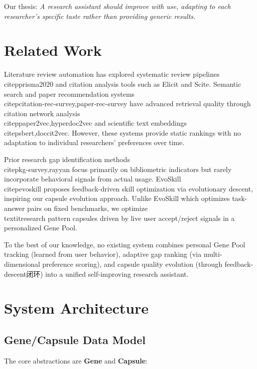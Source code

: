 \documentclass[anon,9pt]{article}
\begin{document}
Our thesis: \textit{A research assistant should improve with use, adapting to each researcher's specific taste rather than providing generic results.}

\section{Related Work}

Literature review automation has explored systematic review pipelines~\\citep{prisma2020} and citation analysis tools such as Elicit and Scite. Semantic search and paper recommendation systems\\citep{citation-rec-survey,paper-rec-survey} have advanced retrieval quality through citation network analysis\\citep{paper2vec,hyperdoc2vec} and scientific text embeddings\\citep{sbert,doccit2vec}. However, these systems provide static rankings with no adaptation to individual researchers' preferences over time.

Prior research gap identification methods\\citep{kg-survey,rayyan} focus primarily on bibliometric indicators but rarely incorporate behavioral signals from actual usage. EvoSkill~\\citep{evoskill} proposes feedback-driven skill optimization via evolutionary descent, inspiring our capsule evolution approach. Unlike EvoSkill which optimizes task-answer pairs on fixed benchmarks, we optimize \\textit{research pattern capsules} driven by live user accept/reject signals in a personalized Gene Pool.

To the best of our knowledge, no existing system combines personal Gene Pool tracking (learned from user behavior), adaptive gap ranking (via multi-dimensional preference scoring), and capsule quality evolution (through feedback-descent闭环) into a unified self-improving research assistant.


\section{System Architecture}

\subsection{Gene/Capsule Data Model}

The core abstractions are \textbf{Gene} and \textbf{Capsule}:
\end{document}
